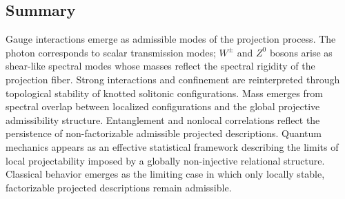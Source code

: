 \subsection{Summary}
  \label{subsec:summary-quantum}

  Gauge interactions emerge as admissible modes of the projection process.
  The photon corresponds to scalar transmission modes; $W^\pm$ and $Z^0$
  bosons arise as shear-like spectral modes whose masses reflect the
  spectral rigidity of the projection fiber.
  Strong interactions and confinement are reinterpreted through topological
  stability of knotted solitonic configurations.
  Mass emerges from spectral overlap between localized configurations and
  the global projective admissibility structure.
  Entanglement and nonlocal correlations reflect the persistence of
  non-factorizable admissible projected descriptions.
  Quantum mechanics appears as an effective statistical framework
  describing the limits of local projectability imposed by a globally
  non-injective relational structure.
  Classical behavior emerges as the limiting case in which only locally
  stable, factorizable projected descriptions remain admissible.
